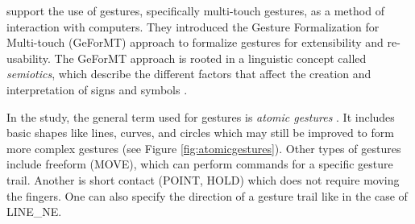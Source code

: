 \citet{kammer2010towards} support the use of gestures, specifically multi-touch gestures, as a method of interaction with computers. They introduced the Gesture Formalization for Multi-touch (GeForMT) approach to formalize gestures for extensibility and re-usability. The GeForMT approach is rooted in a linguistic concept called \textit{semiotics}, which describe the different factors that affect the creation and interpretation of signs and symbols \citep{kammer2010towards,eco1976theory,nespoulous2014biological}. 

In the study, the general term used for gestures is \textit{atomic gestures} \citep{kammer2010towards}. It includes basic shapes like lines, curves, and circles which may still be improved to form more complex gestures (see Figure \ref{fig:atomicgestures}). Other types of gestures include freeform (MOVE), which can perform commands for a specific gesture trail. Another is short contact (POINT, HOLD) which does not require moving the fingers. One can also specify the direction of a gesture trail like in the case of LINE\_NE.



\begin{comment}


The overview of this technique is shown in Table \ref{tab:semiotics}.

\begin{table}[H]
	\centering
  \caption{Overview of semiotics for multi-touch gestures \label{tab:semiotics} \citep{kammer2010towards}.}
  
  \texttt{[image: Semiotics]}
\end{table}
\end{comment}


